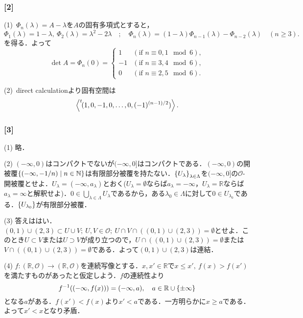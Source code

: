 \documentclass[a4j]{ltjsarticle}
\newcommand{\Rset}{\mathbb{R}}
\newcommand{\Nset}{\mathbb{N}}
\newcommand{\1}{\mathbbm{1}}
\newcommand{\transpose}[1]{\prescript{t\!}{}{#1}}
\numberwithin{equation}{section}
\theoremstyle{definition}
\begin{document}
\subsubsection*{[2]}
(1)\ $\Phi_n(\lambda)=A-\lambda$を$A$の固有多項式とすると，
\begin{equation}
    \Phi_1(\lambda)=1-\lambda,\ \Phi_2(\lambda)=\lambda^2-2\lambda\quad ;\quad \Phi_n(\lambda)=(1-\lambda)\Phi_{n-1}(\lambda)-\Phi_{n-2}(\lambda)\quad (n\geq3).
\end{equation}
を得る．よって
\begin{equation}
    \det A=\Phi_n(0)=\begin{cases}
        1 & (\text{if }n\equiv 0,1\mod 6),\\
        -1 & (\text{if }n\equiv 3,4\mod 6),\\
        0  & (\text{if }n\equiv 2,5\mod 6).
    \end{cases}
\end{equation}

(2)\ direct calculationより固有空間は
\begin{equation}
    \left\langle\transpose{(1,0,-1,0,\ldots,0,(-1)^{(n-1)/2})}\right\rangle.
\end{equation}
\subsubsection*{[3]}
(1) 略．

(2) $(-\infty,0)$はコンパクトでないが$(-\infty,0]$はコンパクトである．$(-\infty,0)$の開被覆$\qty{(-\infty,-1/n)\mid n\in\Nset}$は有限部分被覆を持たない．$\qty{U_\lambda}_{\lambda\in\Lambda}$を$(-\infty,0]$の$\mathcal{O}$-開被覆とせよ．$U_\lambda=(-\infty,a_\lambda)$とおく($U_\lambda=\emptyset$ならば$a_\lambda=-\infty$，$U_\lambda=\Rset$ならば$a_{\lambda}=\infty$と解釈せよ)．$0\in \bigcup_{\lambda\in\Lambda} U_{\lambda}$であるから，ある$\lambda_{0}\in\Lambda$に対して$0\in U_{\lambda_0}$である．$\qty{U_{\lambda_0}}$が有限部分被覆．

(3) 答えははい．$(0,1)\cup(2,3)\subset U\cup V;\ U,V\in\mathcal{O};\ U\cap V\cap((0,1)\cup(2,3))=\emptyset$とせよ．このとき$U\subset V$または$U\supset V$が成り立つので，$U\cap((0,1)\cup(2,3))=\emptyset$または$V\cap ((0,1)\cup(2,3))=\emptyset$である．よって$(0,1)\cup(2,3)$は連結．

(4) $f\colon(\Rset,\mathcal{O})\to(\Rset,\mathcal{O})$を連続写像とする．$x,x'\in\Rset$で$x\leq x',\ f(x)>f(x')$を満たすものがあったと仮定しよう．$f$の連続性より
\begin{equation}
    f^{-1}((-\infty,f(x)))=(-\infty,a),\quad a\in\Rset\cup\qty{\pm\infty}
\end{equation}
となる$a$がある．$f(x')<f(x)$より$x'<a$である．一方明らかに$x\geq a$である．よって$x'<x$となり矛盾．
\end{document}
